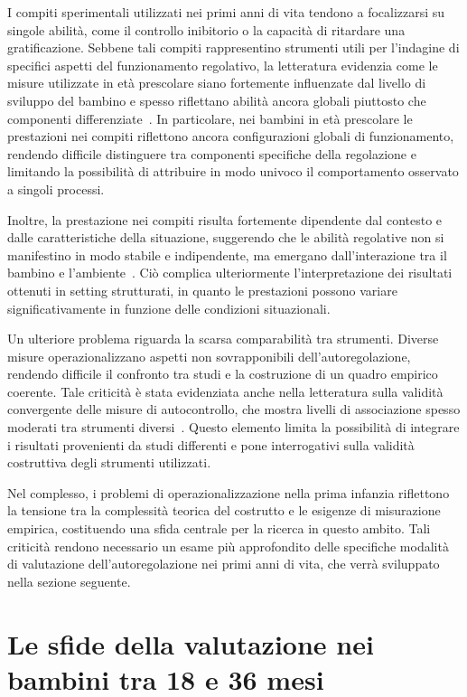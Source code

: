             I compiti sperimentali utilizzati nei primi anni di vita tendono a focalizzarsi su singole abilità, come il controllo inibitorio o la capacità di ritardare una gratificazione. Sebbene tali compiti rappresentino strumenti utili per l'indagine di specifici aspetti del funzionamento regolativo, la letteratura evidenzia come le misure utilizzate in età prescolare siano fortemente influenzate dal livello di sviluppo del bambino e spesso riflettano abilità ancora globali piuttosto che componenti differenziate~\cite{carlson2005,zelazo2020}. In particolare, nei bambini in età prescolare le prestazioni nei compiti riflettono ancora configurazioni globali di funzionamento, rendendo difficile distinguere tra componenti specifiche della regolazione e limitando la possibilità di attribuire in modo univoco il comportamento osservato a singoli processi.

            Inoltre, la prestazione nei compiti risulta fortemente dipendente dal contesto e dalle caratteristiche della situazione, suggerendo che le abilità regolative non si manifestino in modo stabile e indipendente, ma emergano dall'interazione tra il bambino e l'ambiente~\cite{doebel2020}. Ciò complica ulteriormente l'interpretazione dei risultati ottenuti in setting strutturati, in quanto le prestazioni possono variare significativamente in funzione delle condizioni situazionali.

            Un ulteriore problema riguarda la scarsa comparabilità tra strumenti. Diverse misure operazionalizzano aspetti non sovrapponibili dell'autoregolazione, rendendo difficile il confronto tra studi e la costruzione di un quadro empirico coerente. Tale criticità è stata evidenziata anche nella letteratura sulla validità convergente delle misure di autocontrollo, che mostra livelli di associazione spesso moderati tra strumenti diversi~\cite{duckworth2011}. Questo elemento limita la possibilità di integrare i risultati provenienti da studi differenti e pone interrogativi sulla validità costruttiva degli strumenti utilizzati.

            Nel complesso, i problemi di operazionalizzazione nella prima infanzia riflettono la tensione tra la complessità teorica del costrutto e le esigenze di misurazione empirica, costituendo una sfida centrale per la ricerca in questo ambito. Tali criticità rendono necessario un esame più approfondito delle specifiche modalità di valutazione dell'autoregolazione nei primi anni di vita, che verrà sviluppato nella sezione seguente.

    \section{Le sfide della valutazione nei bambini tra 18 e 36 mesi}
    \label{sec:3_2}

